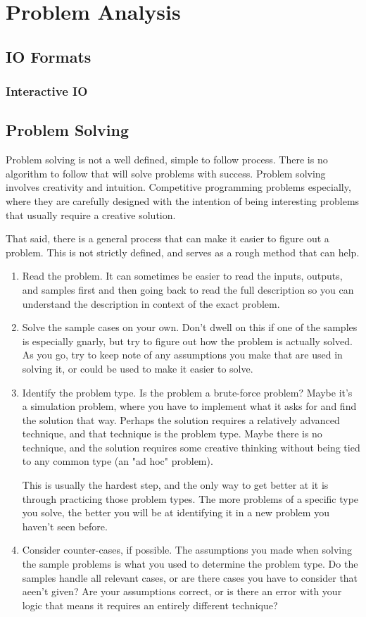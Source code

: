 \section{Problem Analysis}
\subsection{IO Formats}
\subsubsection{Interactive IO}
\subsection{Problem Solving}

Problem solving is not a well defined, simple to follow process. There is no algorithm to follow that will solve problems with success. Problem solving involves creativity and intuition. Competitive programming problems especially, where they are carefully designed with the intention of being interesting problems that usually require a creative solution.

That said, there is a general process that can make it easier to figure out a problem. This is not strictly defined, and serves as a rough method that can help.

\begin{enumerate}
\item Read the problem. It can sometimes be easier to read the inputs, outputs, and samples first and then going back to read the full description so you can understand the description in context of the exact problem.
\item Solve the sample cases on your own. Don't dwell on this if one of the samples is especially gnarly, but try to figure out how the problem is actually solved. As you go, try to keep note of any assumptions you make that are used in solving it, or could be used to make it easier to solve.
\item Identify the problem type. Is the problem a brute-force problem? Maybe it's a simulation problem, where you have to implement what it asks for and find the solution that way. Perhaps the solution requires a relatively advanced technique, and that technique is the problem type. Maybe there is no technique, and the solution requires some creative thinking without being tied to any common type (an "ad hoc" problem).

This is usually the hardest step, and the only way to get better at it is through practicing those problem types. The more problems of a specific type you solve, the better you will be at identifying it in a new problem you haven't seen before.
\item Consider counter-cases, if possible. The assumptions you made when solving the sample problems is what you used to determine the problem type. Do the samples handle all relevant cases, or are there cases you have to consider that aeen't given? Are your assumptions correct, or is there an error with your logic that means it requires an entirely different technique?
\end{enumerate}


